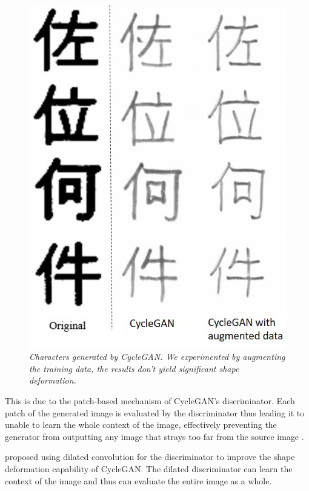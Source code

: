 \documentclass[12pt]{report}
\begin{document}
\begin{figure}[h]
	\centering
	\includegraphics[scale=0.7]{kanji-example}
	\caption{\textit{Characters generated by CycleGAN. We experimented by augmenting the training data, the results don't yield significant shape deformation.}}
	\label{fig:kanji-example}
\end{figure}


This is due to the patch-based mechanism of CycleGAN's discriminator. Each patch of the generated image is evaluated by the discriminator thus leading it to unable to learn the whole context of the image, effectively preventing the generator from outputting any image that strays too far from the source image \cite{ganimorph}.

\cite{ganimorph} proposed using dilated convolution for the discriminator to improve the shape deformation capability of CycleGAN. The dilated discriminator can learn the context of the image and thus can evaluate the entire image as a whole.
\end{document}
